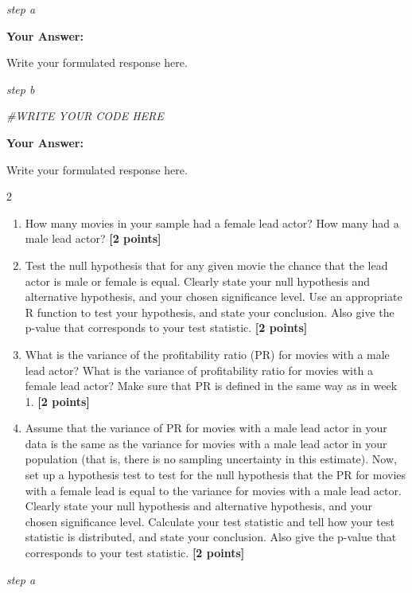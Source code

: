\documentclass[
]{article}
\newenvironment{Shaded}{\begin{snugshade}}{\end{snugshade}}
\newcommand{\CommentTok}[1]{\textcolor[rgb]{0.56,0.35,0.01}{\textit{#1}}}
\providecommand{\tightlist}{%
  \setlength{\itemsep}{0pt}\setlength{\parskip}{0pt}}
\begin{document}
\emph{step a}

\textbf{Your Answer:}

Write your formulated response here.

\emph{step b}

\begin{Shaded}
\begin{Highlighting}[]
\CommentTok{\#WRITE YOUR CODE HERE}
\end{Highlighting}
\end{Shaded}

\textbf{Your Answer:}

Write your formulated response here.

2

\begin{enumerate}
\def\labelenumi{\alph{enumi}.}
\tightlist
\item
  How many movies in your sample had a female lead actor? How many had a
  male lead actor? \textbf{[2 points]}
\item
  Test the null hypothesis that for any given movie the chance that the
  lead actor is male or female is equal. Clearly state your null
  hypothesis and alternative hypothesis, and your chosen significance
  level. Use an appropriate R function to test your hypothesis, and
  state your conclusion. Also give the p-value that corresponds to your
  test statistic. \textbf{[2 points]}
\item
  What is the variance of the profitability ratio (PR) for movies with a
  male lead actor? What is the variance of profitability ratio for
  movies with a female lead actor? Make sure that PR is defined in the
  same way as in week 1. \textbf{[2 points]}
\item
  Assume that the variance of PR for movies with a male lead actor in
  your data is the same as the variance for movies with a male lead
  actor in your population (that is, there is no sampling uncertainty in
  this estimate). Now, set up a hypothesis test to test for the null
  hypothesis that the PR for movies with a female lead is equal to the
  variance for movies with a male lead actor. Clearly state your null
  hypothesis and alternative hypothesis, and your chosen significance
  level. Calculate your test statistic and tell how your test statistic
  is distributed, and state your conclusion. Also give the p-value that
  corresponds to your test statistic. \textbf{[2 points]}
\end{enumerate}

\emph{step a}
\end{document}

